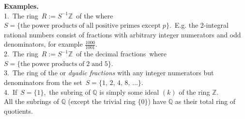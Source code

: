 \documentclass[12pt]{article}
\theoremstyle{definition}
\begin{document}
\textbf{Examples.}\\

1.\, The ring\, $R := S^{-1}\mathbb{Z}$\, of the {\em {}} where\\
$S = \{\mathrm{the\;power\;products\;of\;all\;positive\;primes\;except\;} p\}$.\, E.g. the 2-integral rational numbers consist of fractions with arbitrary integer numerators and odd denominators, for example $\frac{1000}{1001}$.\\

2.\, The ring\, $R := S^{-1}\mathbb{Z}$\, of the decimal fractions \,where\, 
$S = \{\mathrm{the\;power\;products\;of\;2\;and\;5}\}$.\\

3.\, The ring of the  or {\em dyadic fractions} with any integer numerators but denominators from the set\, $S = \{1,\,2,\,4,\,8,\,\ldots\}$.\\

4.\, If\, $S = \{1\}$,\, the subring of $\mathbb{Q}$ is simply some ideal $(k)$ of the ring $\mathbb{Z}$.\\

All the subrings of $\mathbb{Q}$ (except the trivial ring $\{0\}$) have $\mathbb{Q}$ as their total ring of quotients.

\end{document}
